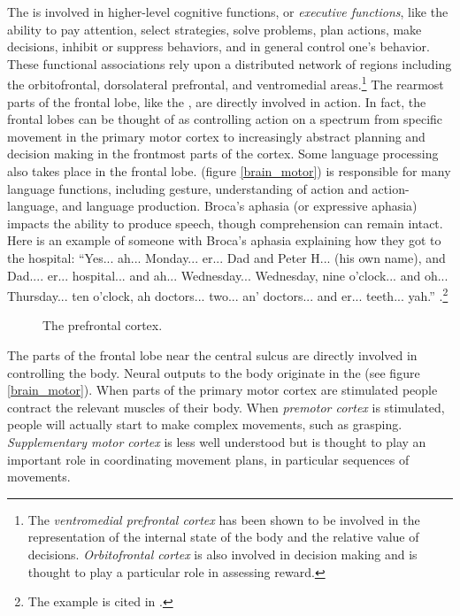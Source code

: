 The  is involved in higher-level cognitive functions, or \emph{executive functions}, like the ability to pay attention, select strategies, solve problems, plan actions, make decisions, inhibit or suppress behaviors, and in general control one's behavior. These functional associations rely upon a distributed network of regions including the orbitofrontal, dorsolateral prefrontal, and ventromedial areas.\footnote{The \emph{ventromedial prefrontal cortex} has been shown to be involved in the representation of the internal state of the body and the relative value of decisions. \emph{Orbitofrontal cortex} is also involved in decision making and is thought to play a particular role in assessing reward.} The rearmost parts of the frontal lobe, like the , are directly involved in action. In fact, the frontal lobes can be thought of as controlling action on a spectrum from specific movement in the primary motor cortex to increasingly abstract planning and decision making in the frontmost parts of the cortex. Some language processing also takes place in the frontal lobe.  (figure \ref{brain_motor}) is responsible for many language functions, including gesture, understanding of action and action-language, and language production. Broca's aphasia (or expressive aphasia) impacts the ability to produce speech, though comprehension can remain intact. Here is an example of someone with Broca's aphasia explaining how they got to the hospital: ``Yes... ah... Monday... er... Dad and Peter H... (his own name), and Dad.... er... hospital... and ah... Wednesday... Wednesday, nine o'clock... and oh... Thursday... ten o'clock, ah doctors... two... an' doctors... and er... teeth... yah.'' \cite{goodglass1976language}.\footnote{The example is cited in .}

\begin{figure}[h]
\centering
{}
\caption[Pamela Payne.]{The prefrontal cortex.}
\label{brain_frontal}
\end{figure}

The parts of the frontal lobe near the central sulcus are directly involved in controlling the body. Neural outputs to the body originate in the  (see figure \ref{brain_motor}). When parts of the primary motor cortex are stimulated people contract the relevant muscles of their body. When \emph{premotor cortex} is stimulated, people will actually start to make complex movements, such as grasping. \emph{Supplementary motor cortex} is less well understood but is thought to play an important role in coordinating movement plans, in particular sequences of movements.

